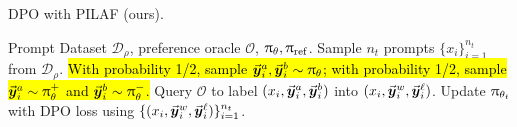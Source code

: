 
\begin{algorithm}
\caption{DPO with PILAF (ours).}
\label{alg:our_sampling}
\begin{algorithmic}[1]
    \INPUT Prompt Dataset $\mathcal{D}_\rho$, preference oracle $\mathcal{O}$, $\uppi_{\theta}, \uppi_{{\rm ref}}$.
        \STATE Sample $n_t$ prompts $\{x_i\}_{i=1}^{n_t}$ from $\mathcal{D}_\rho$.
        \STATE \hl{With probability 1/2, sample $\vec{\boldsymbol{y}}\!\,^a_i, \vec{\boldsymbol{y}}\!\,^b_i \sim \uppi_{\theta}$; with probability 1/2, sample $\vec{\boldsymbol{y}}\!\,^a_i \sim \uppi_{\theta}^+$ and $\vec{\boldsymbol{y}}\!\,^b_i \sim \uppi_{\theta}^-$.}
        \STATE Query $\mathcal{O}$ to label $(x_i, \vec{\boldsymbol{y}}\!\,^a_i, \vec{\boldsymbol{y}}\!\,^b_i)$ into $(x_i, \vec{\boldsymbol{y}}\!\,^w_{i}, \vec{\boldsymbol{y}}\!\,^{\ell}_{i})$.
        \STATE Update $\uppi_{\theta_t}$ with DPO loss using $\{(x_i, \vec{\boldsymbol{y}}\!\,^w_{i}, \vec{\boldsymbol{y}}\!\,^{\ell}_{i})\}_{i=1}^{n_t}$.
    \ENDFOR
\end{algorithmic}
\end{algorithm}
\vspace{-1em}




